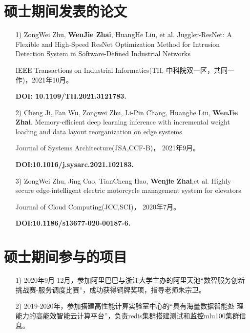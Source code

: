 
\begin{publications}

\section{硕士期间发表的论文}
\begin{itemize}
    \item[1)] ZongWei Zhu, \textbf{WenJie Zhai}, HuangHe Liu, et al. Juggler-ResNet: A Flexible and High-Speed ResNet Optimization Method for Intrusion Detection System in Software-Defined Industrial Networks
    
    IEEE Transactions on Industrial Informatics(TII, 中科院双一区，共同一作)，2021年10月。
    
    \textbf{DOI: 10.1109/TII.2021.3121783.}
    
    \item[2)] Cheng Ji, Fan Wu, Zongwei Zhu, Li-Pin Chang, Huanghe Liu, \textbf{WenJie Zhai}. Memory-efficient deep learning inference with incremental weight loading and data layout reorganization on edge systems
    
    Journal of Systems Architecture(JSA,CCF-B)， 2021年9月。
    
    \textbf{DOI:10.1016/j.sysarc.2021.102183.}
    
    \item[3)] ZongWei Zhu, Jing Cao, TianCheng Hao, \textbf{Wenjie Zhai},et al. Highly secure edge-intelligent electric motorcycle management system for elevators
    
    Journal of Cloud Computing(JCC,SCI)， 2020年7月。
    
    \textbf{DOI:10.1186/s13677-020-00187-6.}
\end{itemize}


\section{硕士期间参与的项目}

\begin{itemize}
    \item[1)] 2020年9月-12月，参加阿里巴巴与浙江大学主办的阿里天池“数智服务创新挑战赛-服务调度比赛”，成功获得铜牌奖项，指导老师朱宗卫。    
    \item[2)] 2019-2020年，参加搭建高性能计算实验室中心的“具有海量数据智能处
    理能力的高能效智能云计算平台”，负责redis集群搭建测试和监控mlu100集群信息。
\end{itemize}


\end{publications}
